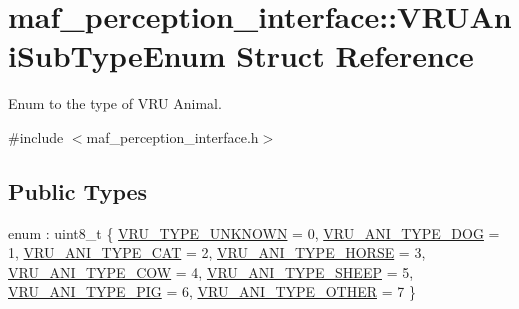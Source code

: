 \hypertarget{structmaf__perception__interface_1_1VRUAniSubTypeEnum}{}\section{maf\+\_\+perception\+\_\+interface\+:\+:V\+R\+U\+Ani\+Sub\+Type\+Enum Struct Reference}
\label{structmaf__perception__interface_1_1VRUAniSubTypeEnum}


Enum to the type of V\+RU Animal.  




{\ttfamily \#include $<$maf\+\_\+perception\+\_\+interface.\+h$>$}

\subsection*{Public Types}
\begin{DoxyCompactItemize}
\item 
enum \+: uint8\+\_\+t \{ \newline
\hyperlink{structmaf__perception__interface_1_1VRUAniSubTypeEnum_ac8a6e5537298662359295f3ab633e5daa50690a3a72c1d69a6c48cf2eed591ca0}{V\+R\+U\+\_\+\+T\+Y\+P\+E\+\_\+\+U\+N\+K\+N\+O\+WN} = 0, 
\hyperlink{structmaf__perception__interface_1_1VRUAniSubTypeEnum_ac8a6e5537298662359295f3ab633e5daaf7dcb435afe7495c682f383fd34ccbad}{V\+R\+U\+\_\+\+A\+N\+I\+\_\+\+T\+Y\+P\+E\+\_\+\+D\+OG} = 1, 
\hyperlink{structmaf__perception__interface_1_1VRUAniSubTypeEnum_ac8a6e5537298662359295f3ab633e5daaaa9a28880ca784687eb4c9e77236fc3b}{V\+R\+U\+\_\+\+A\+N\+I\+\_\+\+T\+Y\+P\+E\+\_\+\+C\+AT} = 2, 
\hyperlink{structmaf__perception__interface_1_1VRUAniSubTypeEnum_ac8a6e5537298662359295f3ab633e5daa1492517d8f20db43f2e753aaa30471db}{V\+R\+U\+\_\+\+A\+N\+I\+\_\+\+T\+Y\+P\+E\+\_\+\+H\+O\+R\+SE} = 3, 
\newline
\hyperlink{structmaf__perception__interface_1_1VRUAniSubTypeEnum_ac8a6e5537298662359295f3ab633e5daab422e8df3204d487400f3250667f3b53}{V\+R\+U\+\_\+\+A\+N\+I\+\_\+\+T\+Y\+P\+E\+\_\+\+C\+OW} = 4, 
\hyperlink{structmaf__perception__interface_1_1VRUAniSubTypeEnum_ac8a6e5537298662359295f3ab633e5daa2db7955fa57ea8a5d53aa35b395f02ec}{V\+R\+U\+\_\+\+A\+N\+I\+\_\+\+T\+Y\+P\+E\+\_\+\+S\+H\+E\+EP} = 5, 
\hyperlink{structmaf__perception__interface_1_1VRUAniSubTypeEnum_ac8a6e5537298662359295f3ab633e5daa40c3c349de2eb4cf99463c61ab52879d}{V\+R\+U\+\_\+\+A\+N\+I\+\_\+\+T\+Y\+P\+E\+\_\+\+P\+IG} = 6, 
\hyperlink{structmaf__perception__interface_1_1VRUAniSubTypeEnum_ac8a6e5537298662359295f3ab633e5daaac25bcc4237c6dcd217d4d650c522935}{V\+R\+U\+\_\+\+A\+N\+I\+\_\+\+T\+Y\+P\+E\+\_\+\+O\+T\+H\+ER} = 7
 \}
\end{DoxyCompactItemize}
